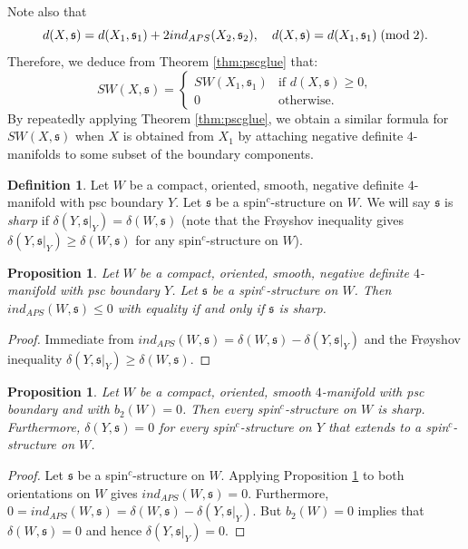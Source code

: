 \documentclass{amsart}
\newtheorem{proposition}[theorem]{Proposition}
\theoremstyle{definition}
\newtheorem{definition}[theorem]{Definition}
\theoremstyle{remark}
\numberwithin{equation}{section}
\begin{document}
Note also that
\[
d(X , \mathfrak{s})  = d(X_1 , \mathfrak{s}_1) + 2 ind_{APS}(X_2 , \mathfrak{s}_2), \quad d(X,\mathfrak{s}) = d(X_1 , \mathfrak{s}_1) \; ({\rm mod} \; 2).
\]
Therefore, we deduce from Theorem \ref{thm:pscglue} that:
\[
SW(X , \mathfrak{s}) = \begin{cases} SW(X_1 , \mathfrak{s}_1) & \text{if } d(X,\mathfrak{s}) \ge 0, \\ 0 & \text{otherwise}. \end{cases}
\]
By repeatedly applying Theorem \ref{thm:pscglue}, we obtain a similar formula for $SW(X,\mathfrak{s})$ when $X$ is obtained from $X_1$ by attaching negative definite $4$-manifolds to some subset of the boundary components. 

\begin{definition}\label{def:sharp}
Let $W$ be a compact, oriented, smooth, negative definite $4$-manifold with psc boundary $Y$. Let $\mathfrak{s}$ be a spin$^c$-structure on $W$. We will say $\mathfrak{s}$ is {\em sharp} if $\delta(Y , \mathfrak{s}|_Y) = \delta(W , \mathfrak{s})$ (note that the Fr\o yshov inequality gives $\delta(Y , \mathfrak{s}|_Y) \ge \delta(W , \mathfrak{s})$ for any spin$^c$-structure on $W$).
\end{definition}

\begin{proposition}\label{prop:indle}
Let $W$ be a compact, oriented, smooth, negative definite $4$-manifold with psc boundary $Y$. Let $\mathfrak{s}$ be a spin$^c$-structure on $W$. Then $ind_{APS}( W , \mathfrak{s} ) \le 0$ with equality if and only if $\mathfrak{s}$ is sharp.
\end{proposition}
\begin{proof}
Immediate from $ind_{APS}(W , \mathfrak{s}) = \delta(W , \mathfrak{s}) - \delta(Y , \mathfrak{s}|_Y)$ and the Fr\o yshov inequality $\delta(Y , \mathfrak{s}|_Y) \ge \delta(W , \mathfrak{s})$.
\end{proof}

\begin{proposition}
Let $W$ be a compact, oriented, smooth $4$-manifold with psc boundary and with $b_2(W) = 0$. Then every spin$^c$-structure on $W$ is sharp. Furthermore, $\delta(Y , \mathfrak{s}) = 0$ for every spin$^c$-structure on $Y$ that extends to a spin$^c$-structure on $W$.
\end{proposition}
\begin{proof}
Let $\mathfrak{s}$ be a spin$^c$-structure on $W$. Applying Proposition \ref{prop:indle} to both orientations on $W$ gives $ind_{APS}(W , \mathfrak{s}) = 0$. Furthermore, $0 = ind_{APS}(W , \mathfrak{s}) = \delta(W , \mathfrak{s}) - \delta(Y , \mathfrak{s}|_Y)$. But $b_2(W) = 0$ implies that $\delta(W , \mathfrak{s}) = 0$ and hence $\delta(Y , \mathfrak{s}|_Y) = 0$.
\end{proof}
\end{document}
